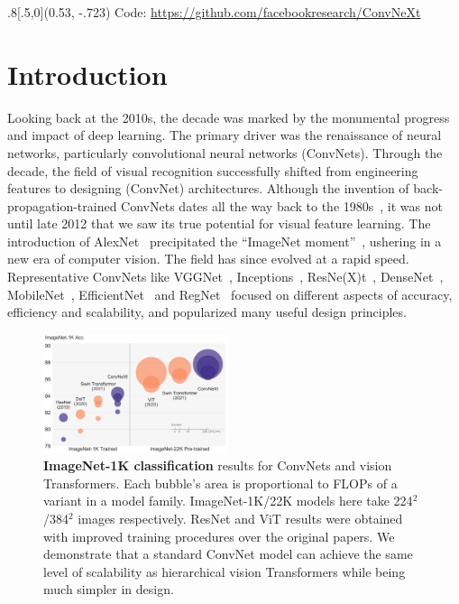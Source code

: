 \documentclass[10pt,twocolumn,letterpaper]{article}
\begin{document}
\begin{textblock*}{.8\textwidth}[.5,0](0.53\textwidth, -.723\textwidth)
\centering
{\hspace{-6ex} \small Code: \url{https://github.com/facebookresearch/ConvNeXt}}
\end{textblock*}

\section{Introduction}
\label{sec:intro}

Looking back at the 2010s, the decade was marked by the monumental progress and impact of deep learning. The primary driver was the renaissance of neural networks, particularly convolutional neural networks (ConvNets). Through the decade, the field of visual recognition successfully shifted from engineering features to designing (ConvNet) architectures. Although the invention of back-propagation-trained ConvNets dates all the way back to the 1980s~\cite{LeCun1989}, it was not until late 2012 that we saw its true potential for visual feature learning. The introduction of AlexNet~\cite{Krizhevsky2012} precipitated the ``ImageNet moment''~\cite{Russakovsky2015}, ushering in a new era of computer vision. The field has since evolved at a rapid speed. Representative ConvNets like VGGNet~\cite{Simonyan2014}, Inceptions~\cite{Szegedy2015}, ResNe(X)t~\cite{He2016,Xie2017}, DenseNet~\cite{Huang2017}, MobileNet~\cite{Howard2017}, EfficientNet~\cite{Tan2019efficientnet} and RegNet~\cite{Radosavovic2020designing} focused on different aspects of accuracy, efficiency and scalability, and popularized many useful design principles. 

\begin{figure}[t]
\centering
\vspace{-0em}
\includegraphics[width=0.48\textwidth]{figs/teaser.pdf}
\vspace{-1.3em}
\caption{\textbf{ImageNet-1K classification} results for \cb ConvNets and \vb vision Transformers. Each bubble's area is proportional to FLOPs of a variant in a model family. ImageNet-1K/22K models here take 224$^2$/384$^2$ images respectively. ResNet and ViT results were obtained with improved training procedures over the original papers. We demonstrate that a standard ConvNet model can achieve the same level of scalability as hierarchical vision Transformers while being much simpler in design.}
\label{fig:teaser}\vspace{-1.7em}
\end{figure}
\end{document}
